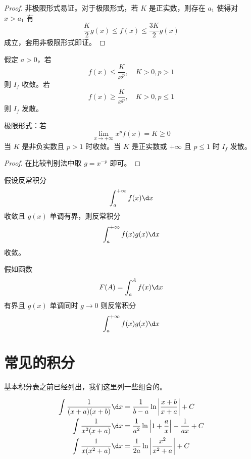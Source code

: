 \begin{proof}
	非极限形式易证。对于极限形式，若 $K$ 是正实数，则存在 $a_1$ 使得对 $x > a_1$ 有
	\[ \frac{K}{2} g(x) \leqslant f(x) \leqslant \frac{3K}{2} g(x) \]
	成立，套用非极限形式即证。
\end{proof}

\begin{theorem}
	假定 $a > 0$，若
	\[ f(x) \leqslant \frac{K}{x^p}, \quad K > 0, p > 1 \]
	则 $I_f$ 收敛。若
	\[ f(x) \geqslant \frac{K}{x^p}, \quad K > 0, p \leqslant 1 \]
	则 $I_f$ 发散。

	极限形式：若
	\[ \lim_{x \to +\infty} x^p f(x) = K \geqslant 0 \]
	当 $K$ 是非负实数且 $p > 1$ 时收敛。当 $K$ 是正实数或 $+\infty$ 且 $p \leqslant 1$ 时 $I_f$ 发散。
\end{theorem}

\begin{proof}
	在比较判别法中取 $g = x^{-p}$ 即可。
\end{proof}

\begin{theorem}
	假设反常积分
	\[ \int_{a}^{+\infty} f(x) \d x \]
	收敛且 $g(x)$ 单调有界，则反常积分
	\[ \int_{a}^{+\infty} f(x) g(x) \d x \]
	收敛。
\end{theorem}

\begin{theorem}
	假如函数
	\[ F(A) = \int_{a}^{A} f(x) \d x \]
	有界且 $g(x)$ 单调同时 $g \to 0$ 则反常积分
	\[ \int_{a}^{+\infty} f(x) g(x) \d x \]
\end{theorem}

\section{常见的积分}

基本积分表之前已经列出，我们这里列一些组合的。



\begin{example}[有理式]
	\[ \begin{aligned}
			\int \frac{1}{(x+a)(x+b)} \d x & = \frac{1}{b-a} \ln \left| \frac{x+b}{x+a} \right| + C                \\
			\int \frac{1}{x^2(x+a)}   \d x & = \frac{1}{a^2} \ln \left| 1 + \frac{a}{x} \right| - \frac{1}{ax} + C \\
			\int \frac{1}{x(x^2+a)}   \d x & = \frac{1}{2a} \ln \left| \frac{x^2}{x^2+a}\right| + C
		\end{aligned} \]
\end{example}

